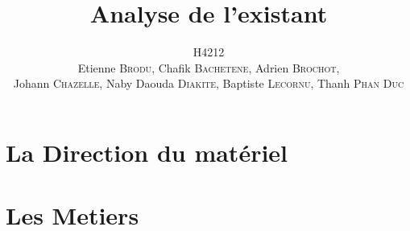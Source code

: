 \documentclass[a4paper,11pt]{article}
\title{Analyse de l'existant}
\author{H4212\\Etienne \textsc{Brodu}, Chafik \textsc{Bachetene}, Adrien \textsc{Brochot},\\Johann \textsc{Chazelle}, Naby Daouda \textsc{Diakite}, Baptiste \textsc{Lecornu}, Thanh \textsc{Phan Duc}}
\begin{document}
\maketitle
\newpage

\tableofcontents
\newpage



\chapter{La Direction du matériel}
	
\chapter{Les Metiers}
	
	
	
\end{document}
